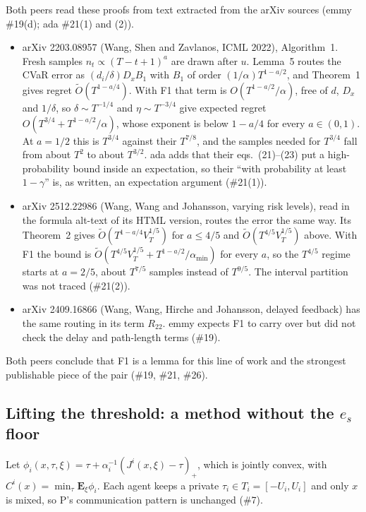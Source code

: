 \documentclass{article}
\newcommand{\E}{\mathbf{E}}
\begin{document}
Both peers read these proofs from text extracted from the arXiv sources
(emmy \#19(d); ada \#21(1) and (2)).
\begin{itemize}
\item arXiv 2203.08957 (Wang, Shen and Zavlanos, ICML 2022), Algorithm~1.
Fresh samples $n_t\propto(T-t+1)^a$ are drawn after $u$. Lemma~5 routes
the CVaR error as $(d_i/\delta)D_xB_1$ with $B_1$ of order
$(1/\alpha)T^{1-a/2}$, and Theorem~1 gives regret $\tilde O(T^{1-a/4})$.
With F1 that term is $O(T^{1-a/2}/\alpha)$, free of $d$, $D_x$ and
$1/\delta$, so $\delta\sim T^{-1/4}$ and $\eta\sim T^{-3/4}$ give expected
regret $O(T^{3/4}+T^{1-a/2}/\alpha)$, whose exponent is below $1-a/4$ for
every $a\in(0,1)$. At $a=1/2$ this is $T^{3/4}$ against their $T^{7/8}$,
and the samples needed for $T^{3/4}$ fall from about $T^2$ to about
$T^{3/2}$. ada adds that their eqs.~(21)--(23) put a high-probability
bound inside an expectation, so their ``with probability at least
$1-\gamma$'' is, as written, an expectation argument (\#21(1)).
\item arXiv 2512.22986 (Wang, Wang and Johansson, varying risk levels),
read in the formula alt-text of its HTML version, routes the error the
same way. Its Theorem~2 gives $\tilde O(T^{1-a/4}V_T^{1/5})$ for
$a\le4/5$ and $\tilde O(T^{4/5}V_T^{1/5})$ above. With F1 the bound is
$\tilde O(T^{4/5}V_T^{1/5}+T^{1-a/2}/\alpha_{\min})$ for every $a$, so the
$T^{4/5}$ regime starts at $a=2/5$, about $T^{7/5}$ samples instead of
$T^{9/5}$. The interval partition was not traced (\#21(2)).
\item arXiv 2409.16866 (Wang, Wang, Hirche and Johansson, delayed
feedback) has the same routing in its term $R_{22}$. emmy expects F1 to
carry over but did not check the delay and path-length terms (\#19).
\end{itemize}
Both peers conclude that F1 is a lemma for this line of work and the
strongest publishable piece of the pair (\#19, \#21, \#26).

\subsection{Lifting the threshold: a method without the $e_s$
floor}\label{sec:lift}

Let $\phi_i(x,\tau,\xi)=\tau+\alpha_i^{-1}(J^i(x,\xi)-\tau)_+$, which is
jointly convex, with $C^i(x)=\min_\tau\E_\xi\phi_i$. Each agent keeps a
private $\tau_i\in T_i=[-U_i,U_i]$ and only $x$ is mixed, so P's
communication pattern is unchanged (\#7).
\end{document}
